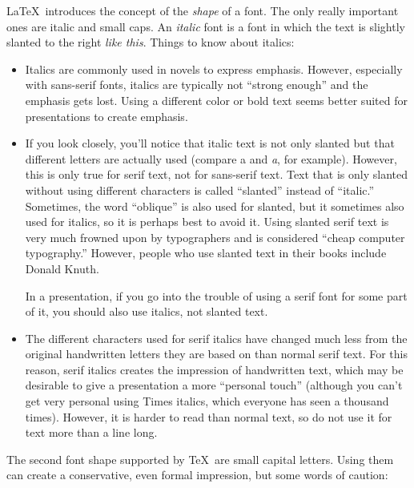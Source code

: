 \LaTeX\ introduces the concept of the \emph{shape} of a font. The only
really important ones are italic and small caps.
An \emph{italic} font is a font in which the text is slightly slanted
to the right \emph{like this}. Things to know about
italics:
\begin{itemize}
\item
  Italics are commonly used in novels to express emphasis. However,
  especially with sans-serif fonts, italics are typically not ``strong
  enough'' and the emphasis gets lost. Using a different color or bold
  text seems better suited for presentations to create emphasis.
\item
  If you look closely, you'll notice that italic text is not only
  slanted but that different letters are actually used (compare a and
  \emph{a}, for example). However, this is only true for serif text,
  not for sans-serif text. Text that is only slanted without using
  different characters is called  ``slanted'' instead of ``italic.''
  Sometimes, the word ``oblique'' is also used for slanted, but it
  sometimes also used for italics, so it is perhaps best to avoid
  it. Using slanted serif text is very much frowned upon by
  typographers and is considered ``cheap computer typography.''
  However, people who use slanted text in their books include Donald
  Knuth.

  In a presentation, if you go into the trouble of using a serif font
  for some part of it, you should also use italics, not slanted text.
\item
  The different characters used for serif italics have changed much
  less  from the original handwritten letters they are based on than
  normal serif text. For this reason, serif italics creates the
  impression of handwritten text, which may be desirable to give a
  presentation a more ``personal touch'' (although you can't get very
  personal using Times italics, which everyone has seen a thousand
  times). However, it is harder to read than normal text, so do not
  use it for text more than a line long.
\end{itemize}

The second font shape supported by \TeX\ are small capital
letters. Using them can create a conservative, even formal
impression, but some words of caution:

